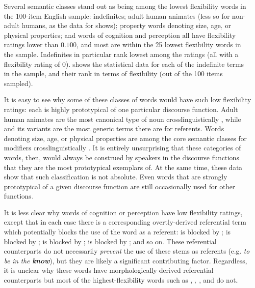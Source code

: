 Several semantic classes stand out as being among the lowest flexibility words in the 100-item English sample: indefinites; adult human animates (less so for non-adult humans, as the data for  shows); property words denoting size, age, or physical properties; and words of cognition and perception all have flexibility ratings lower than $0.100$, and most are within the 25 lowest flexibility words in the sample. Indefinites in particular rank lowest among the ratings (all with a flexibility rating of $0$).  shows the statistical data for each of the indefinite terms in the sample, and their rank in terms of flexibility (out of the 100 items sampled).


It is easy to see why some of these classes of words would have such low flexibility ratings: each is highly prototypical of one particular discourse function. Adult human animates are the most canonical type of noun crosslinguistically , while  and its variants are the most generic terms there are for referents. Words denoting size, age, or physical properties are among the core semantic classes for modifiers crosslinguistically \parencite{Dixon1977}. It is entirely unsurprising that these categories of words, then, would always be construed by speakers in the discourse functions that they are the most prototypical exemplars of. At the same time, these data show that such classification is not absolute. Even words that are strongly prototypical of a given discourse function are still occasionally used for other functions.

It is less clear why words of cognition or perception have low flexibility ratings, except that in each case there is a corresponding overtly-derived referential term which potentially blocks the use of the word as a referent:  is blocked by ;  is blocked by ;  is blocked by ;  is blocked by ; and so on. These referential counterparts do not necessarily \emph{prevent} the use of these stems as referents (e.g. \textit{to be in the \textbf{know}}), but they are likely a significant contributing factor. Regardless, it is unclear why these words have morphologically derived referential counterparts but most of the highest-flexibility words such as , , , and  do not.

